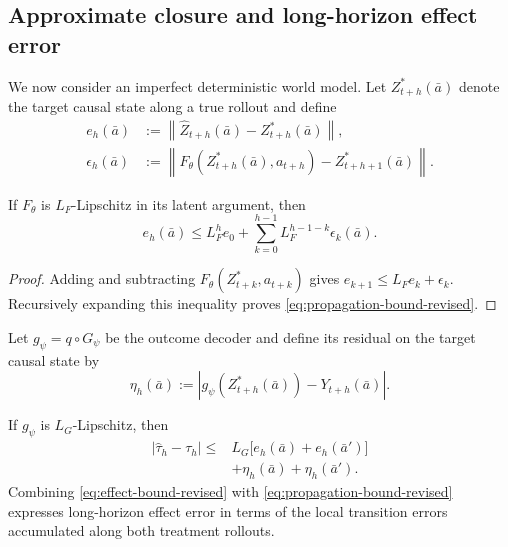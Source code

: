 \subsection{Approximate closure and long-horizon effect error}
\label{sec:approximate-closure}

We now consider an imperfect deterministic world model. Let
$Z^*_{t+h}(\bar a)$ denote the target causal state along a true rollout
and define
\begin{align}
    e_h(\bar a)
    &:={\left\|
        \widehat Z_{t+h}(\bar a)-Z^*_{t+h}(\bar a)
       \right\|},
    \label{eq:latent-rollout-error-revised}\\
    \epsilon_h(\bar a)
    &:={\left\|
        F_\theta(Z^*_{t+h}(\bar a),a_{t+h})
        -Z^*_{t+h+1}(\bar a)
       \right\|}.
    \label{eq:local-transition-error-revised}
\end{align}

\begin{proposition}
\label{prop:approximate-propagation}
If $F_\theta$ is $L_F$-Lipschitz in its latent argument, then
\begin{equation}
    e_h(\bar a)
    \leq L_F^h e_0
    +\sum_{k=0}^{h-1}L_F^{h-1-k}\epsilon_k(\bar a).
    \label{eq:propagation-bound-revised}
\end{equation}
\end{proposition}

\begin{proof}
Adding and subtracting
$F_\theta(Z^*_{t+k},a_{t+k})$ gives
$e_{k+1}\leq L_Fe_k+\epsilon_k$. Recursively expanding this inequality
proves \eqref{eq:propagation-bound-revised}.
\end{proof}

Let $g_\psi=q\circ G_\psi$ be the outcome decoder and define its residual
on the target causal state by
\begin{equation}
    \eta_h(\bar a)
    :=\left|
      g_\psi(Z^*_{t+h}(\bar a))-Y_{t+h}(\bar a)
      \right|.
    \label{eq:decoder-error-revised}
\end{equation}

\begin{corollary}
\label{cor:effect-error-revised}
If $g_\psi$ is $L_G$-Lipschitz, then
\begin{equation}
\begin{split}
    |\widehat\tau_h-\tau_h|
    \leq {}&L_G\bigl[e_h(\bar a)+e_h(\bar a')\bigr]\\
    &+\eta_h(\bar a)+\eta_h(\bar a').
\end{split}
    \label{eq:effect-bound-revised}
\end{equation}
Combining \eqref{eq:effect-bound-revised} with
\eqref{eq:propagation-bound-revised} expresses long-horizon effect error
in terms of the local transition errors accumulated along both treatment
rollouts.
\end{corollary}

